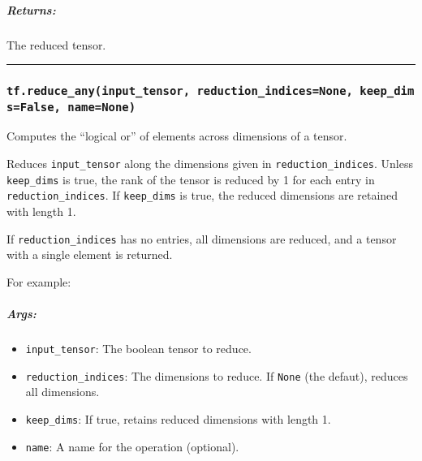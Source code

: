 \subparagraph{Returns: }\label{returns-43}

The reduced tensor.

\begin{center}\rule{0.5\linewidth}{\linethickness}\end{center}

\subsubsection{\texorpdfstring{\texttt{tf.reduce\_any(input\_tensor,\ reduction\_indices=None,\ keep\_dims=False,\ name=None)}
}{tf.reduce\_any(input\_tensor, reduction\_indices=None, keep\_dims=False, name=None) }}\label{tf.reduceux5fanyinputux5ftensor-reductionux5findicesnone-keepux5fdimsfalse-namenone}

Computes the ``logical or'' of elements across dimensions of a tensor.

Reduces \texttt{input\_tensor} along the dimensions given in
\texttt{reduction\_indices}. Unless \texttt{keep\_dims} is true, the
rank of the tensor is reduced by 1 for each entry in
\texttt{reduction\_indices}. If \texttt{keep\_dims} is true, the reduced
dimensions are retained with length 1.

If \texttt{reduction\_indices} has no entries, all dimensions are
reduced, and a tensor with a single element is returned.

For example:

\begin{Shaded}
\begin{Highlighting}[]
\CommentTok{#         [False, False]]}
\OperatorTok{==>} 
\NormalTok{) }\OperatorTok{==>} \NormalTok{[}\NormalTok{, }\NormalTok{]}
\NormalTok{) }\OperatorTok{==>} \NormalTok{[}\NormalTok{, }\NormalTok{]}
\end{Highlighting}
\end{Shaded}

\subparagraph{Args: }\label{args-44}

\begin{itemize}
\tightlist
\item
  \texttt{input\_tensor}: The boolean tensor to reduce.
\item
  \texttt{reduction\_indices}: The dimensions to reduce. If
  \texttt{None} (the defaut), reduces all dimensions.
\item
  \texttt{keep\_dims}: If true, retains reduced dimensions with length
  1.
\item
  \texttt{name}: A name for the operation (optional).
\end{itemize}

